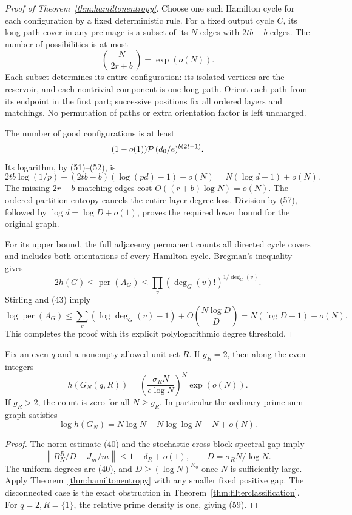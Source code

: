 \begin{proof}[Proof of Theorem~\ref{thm:hamiltonentropy}]
Choose one such Hamilton cycle for each configuration by a
fixed deterministic rule.
For a fixed output cycle \(C\), its long-path cover in any
preimage is a subset of its \(N\) edges with \(2tb-b\) edges.
The number of possibilities is at most
\[
 \binom N{\,2r+b\,}=\exp(o(N)).                              \tag{57}
\]
Each subset determines its entire configuration:
its isolated vertices are the reservoir, and each nontrivial
component is one long path.
Orient each path from its endpoint in the first part;
successive positions fix all ordered layers and matchings.
No permutation of paths or extra orientation factor is
left uncharged.

The number of good configurations is at least
\[
 (1-o(1)){\cal P}\,(d_0/e)^{b(2t-1)}.
\]
Its logarithm, by (51)--(52), is
\[
 2tb\log(1/p)+(2tb-b)(\log(pd)-1)+o(N)
                 =N(\log d-1)+o(N).
\]
The missing \(2r+b\) matching edges cost
\(O((r+b)\log N)=o(N)\).
The ordered-partition entropy cancels the entire layer
degree loss. Division by (57), followed by
\(\log d=\log D+o(1)\), proves the required lower bound
for the original graph.

For its upper bound, the full adjacency permanent counts
all directed cycle covers and includes both orientations
of every Hamilton cycle.
Bregman's inequality gives
\[
 2h(G)\leq\operatorname{per}(A_G)
            \leq\prod_v(\deg_G(v)!)^{1/\deg_G(v)}.
\]
Stirling and (43) imply
\[
 \log\operatorname{per}(A_G)
 \leq\sum_v(\log\deg_G(v)-1)
       +O\left(\frac{N\log D}{D}\right)
 =N(\log D-1)+o(N).
\]
This completes the proof with its explicit polylogarithmic
degree threshold.
\end{proof}

\begin{corollary}
\label{cor:primecircleentropy}
Fix an even \(q\) and a nonempty allowed unit set \(R\).
If \(g_R=2\), then along the even integers
\[
 h(G_N(q,R))
 =\left(\frac{\sigma_R N}{e\log N}\right)^N\exp(o(N)).
 \tag{58}
\]
If \(g_R>2\), the count is zero for all \(N\geq g_R\).
In particular the ordinary prime-sum graph satisfies
\[
 \log h(G_N)
   =N\log N-N\log\log N-N+o(N).
 \tag{59}
\]
\end{corollary}
\begin{proof}
The norm estimate (40) and the stochastic cross-block
spectral gap imply
\[
 \left\|B_N^R/D-J_m/m\right\|
                    \leq1-\delta_R+o(1),
 \qquad D=\sigma_R N/\log N .
\]
The uniform degrees are (40), and
\(D\geq(\log N)^{K_0}\) once \(N\) is sufficiently large.
Apply Theorem~\ref{thm:hamiltonentropy} with any smaller
fixed positive gap.
The disconnected case is the exact obstruction in
Theorem~\ref{thm:filterclassification}.
For \(q=2,R=\{1\}\), the relative prime density is one,
giving (59).
\end{proof}

